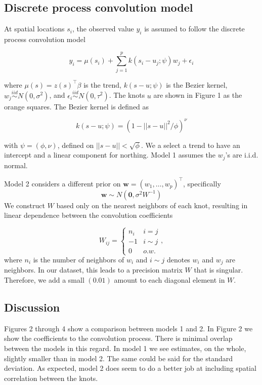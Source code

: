 \documentclass[12pt]{article}
\newcommand{\m}[1]{\mathbf{\bm{#1}}}
\begin{document}
\subsection*{Discrete process convolution model}

At spatial locations $s_i$, the observed value $y_i$ is assumed to follow the discrete process convolution model

\[ y_i = \mu(s_i) + \sum_{j=1}^pk(s_i-u_j;\psi)w_j + \epsilon_i \]

where $\mu(s)=z(s)^\top\beta$ is the trend, $k(s-u;\psi)$ is the Bezier kernel, $w_j\overset{iid}\sim N(0,\sigma^2)$, and $\epsilon_i\overset{iid}\sim N(0,\tau^2)$. The knots $u$ are shown in Figure 1 as the orange squares. The Bezier kernel is defined as

\[ k(s-u;\psi) = (1 - ||s-u||^2/\phi)^\nu \]

with $\psi=(\phi,\nu)$, defined on $||s-u||<\sqrt{\phi}$. We a select a trend to have an intercept and a linear component for northing. Model 1 assumes the $w_j$'s are i.i.d. normal.
\bigskip

Model 2 considers a different prior on $\m{w}=(w_1,\ldots,w_p)^\top$, specifically
\[ \m{w} \sim N(\m{0}, \sigma^2 W^{-1}) \]
We construct $W$ based only on the nearest neighbors of each knot, resulting in linear dependence between the convolution coefficients

\[ W_{ij} = \begin{cases} n_i & i=j \\ -1 & i\sim j \\ 0 & o.w. \end{cases}, \]
where $n_i$ is the number of neighbors of $w_i$ and $i\sim j$ denotes $w_i$ and $w_j$ are neighbors. In our dataset, this leads to a precision matrix $W$ that is singular. Therefore, we add a small $(0.01)$ amount to each diagonal element in $W$.
\bigskip

\subsection*{Discussion}

Figures 2 through 4 show a comparison between models 1 and 2. In Figure 2 we show the coefficients to the convolution process. There is minimal overlap between the models in this regard. In model 1 we see estimates, on the whole, slightly smaller than in model 2. The same could be said for the standard deviation. As expected, model 2 does seem to do a better job at including spatial correlation between the knots.
\bigskip
\end{document}
